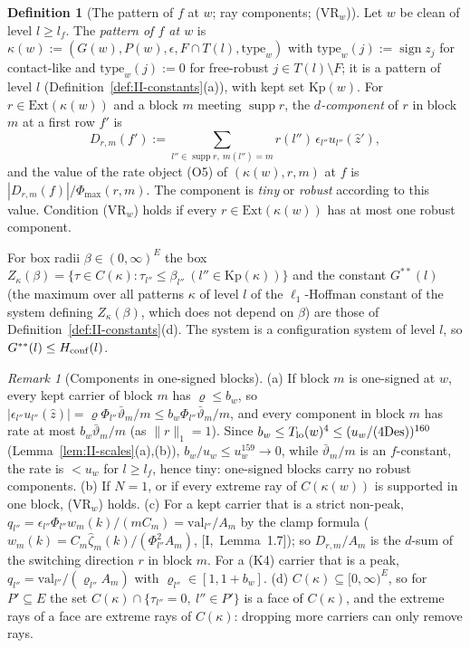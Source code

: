 \documentclass[10pt]{amsart}
\theoremstyle{definition}
\newtheorem{definition}[theorem]{Definition}
\theoremstyle{remark}
\newtheorem{remark}[theorem]{Remark}
\newcommand{\supp}{\operatorname{supp}}
\newcommand{\sgn}{\operatorname{sign}}
\newcommand{\zh}{\hat z}
\begin{document}
\begin{definition}[The pattern of $f$ at $w$; ray components; (VR$_w$)]
\label{def:II-pattern}
Let $w$ be clean of level $l\ge l_f$.  The \emph{pattern of $f$ at $w$} is
$\kappa(w):=(G(w),P(w),\epsilon,F\cap T(l),\mathrm{type}_w)$ with
$\mathrm{type}_w(j):=\sgn z_j$ for contact-like and $\mathrm{type}_w(j):=0$
for free-robust $j\in T(l)\setminus F$; it is a pattern of level $l$
(Definition~\ref{def:II-constants}(a)), with kept set $\mathrm{Kp}(w)$.
For $r\in\mathrm{Ext}(\kappa(w))$ and a block $m$ meeting $\supp r$, the
\emph{$d$-component} of $r$ in block $m$ at a first row $f'$ is
\[
 D_{r,m}(f'):=\sum_{l''\in\supp r,\ m(l'')=m}r(l'')\,\epsilon_{l''}
 u_{l''}(\zh'),
\]
and the value of the rate object (O5) of $(\kappa(w),r,m)$ at $f$ is
$|D_{r,m}(f)|/\Phi_{\max}(r,m)$.  The component is \emph{tiny} or
\emph{robust} according to this value.  Condition \textup{(VR$_w$)} holds if
every $r\in\mathrm{Ext}(\kappa(w))$ has at most one robust component.

For box radii $\beta\in(0,\infty)^{E}$ the box $Z_\kappa(\beta)=\{\tau\in
C(\kappa):\tau_{l''}\le\beta_{l''}\ (l''\in\mathrm{Kp}(\kappa))\}$ and the
constant $G^{**}(l)$ (the maximum over all patterns $\kappa$ of level $l$
of the $\ell_1$-Hoffman constant of the system defining $Z_\kappa(\beta)$,
which does not depend on $\beta$) are those of
Definition~\ref{def:II-constants}(d).  The system is a configuration system
of level $l$, so $G^{**}(l)\le H_{\rm conf}(l)$.
\end{definition}

\begin{remark}[Components in one-signed blocks]\label{rem:II-onesigned}
(a) If block $m$ is one-signed at $w$, every kept carrier of block $m$ has
$\varrho\le b_w$, so $|\epsilon_{l''}u_{l''}(\zh)|=\varrho\Phi_{l''}\bar\vartheta_m/m\le
b_w\Phi_{l''}\bar\vartheta_m/m$, and every component in block $m$ has rate at most
$b_w\bar\vartheta_m/m$ (as $\|r\|_1=1$).  Since $b_w\le T_{\rm lo}(w)^4\le(u_w/(4\mathrm{Des}))^{160}$
(Lemma~\ref{lem:II-scales}(a),(b)), $b_w/u_w\le u_w^{159}\to0$, while
$\bar\vartheta_m/m$ is an $f$-constant, the rate is $<u_w$ for $l\ge l_f$, hence tiny: one-signed blocks carry no robust components.
(b) If $N=1$, or if every extreme ray of $C(\kappa(w))$ is supported in
one block, (VR$_w$) holds.
(c) For a kept carrier that is a strict non-peak, $q_{l''}=\epsilon_{l''}
\Phi_{l''}w_m(k)/(mC_m)=\mathrm{val}_{l''}/A_m$ by the clamp formula
($w_m(k)=C_m\hat\zeta_m(k)/(\Phi_{l''}^2A_m)$, [I,~Lemma~1.7]); so
$D_{r,m}/A_m$ is the $d$-sum of the switching direction $r$ in block $m$.
For a (K4) carrier that is a peak, $q_{l''}=\mathrm{val}_{l''}/(\varrho_{l''}
A_m)$ with $\varrho_{l''}\in[1,1+b_w]$.
(d) $C(\kappa)\subseteq[0,\infty)^E$, so for $P'\subseteq E$ the set
$C(\kappa)\cap\{\tau_{l''}=0,\ l''\in P'\}$ is a face of $C(\kappa)$, and
the extreme rays of a face are extreme rays of $C(\kappa)$: dropping more
carriers can only remove rays.
\end{remark}
\end{document}
